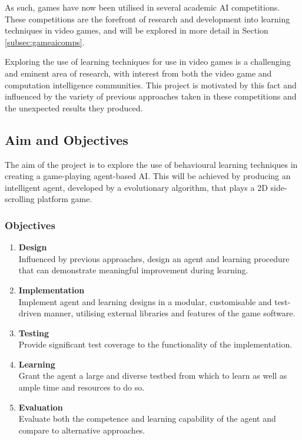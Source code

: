 As such, games have now been utilised in several academic AI competitions. These competitions are the forefront of research and development into learning techniques in video games, and will be explored in more detail in Section \ref{subsec:gameaicomps}.

\vspace{\baselineskip}

Exploring the use of learning techniques for use in video games is a challenging and eminent area of research, with interest from both the video game and computation intelligence communities. This project is motivated by this fact and influenced by the variety of previous approaches taken in these competitions and the unexpected results they produced. 


\subsection{Aim and Objectives}
\label{subsec:aimobj}

The aim of the project is to explore the use of behavioural learning techniques in creating a game-playing agent-based AI. This will be achieved by producing an intelligent agent, developed by a evolutionary algorithm, that plays a 2D side-scrolling platform game.

\subsubsection*{Objectives}

\begin{enumerate}

	\item \label{obj:design}
	\textbf{Design} \\
	Influenced by previous approaches, design an agent and learning procedure that can demonstrate meaningful improvement during learning.
	
	\item \label{obj:impl}
	\textbf{Implementation} \\
	Implement agent and learning designs in a modular, customisable and test-driven manner, utilising external libraries and features of the game software.
	
	\item \label{obj:test}
	\textbf{Testing} \\
	Provide significant test coverage to the functionality of the implementation.
	
	\item \label{obj:learn}
	\textbf{Learning} \\
	Grant the agent a large and diverse testbed from which to learn as well as ample time and resources to do so.
	
	\item \label{obj:eval}
	\textbf{Evaluation} \\
	Evaluate both the competence and learning capability of the agent and compare to alternative approaches.

\end{enumerate}

